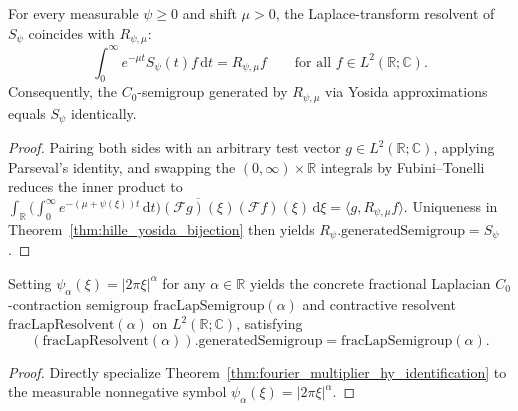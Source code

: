\begin{theorem}\label{thm:fourier_multiplier_hy_identification}
\leanok
For every measurable $\psi \ge 0$ and shift $\mu > 0$, the Laplace-transform resolvent of $S_\psi$ coincides with $R_{\psi, \mu}$:
\[
  \int_0^\infty e^{-\mu t} S_\psi(t) f \, \mathrm{d}t = R_{\psi, \mu} f \qquad \text{for all } f \in L^2(\mathbb{R}; \mathbb{C}).
\]
Consequently, the $C_0$-semigroup generated by $R_{\psi, \mu}$ via Yosida approximations equals $S_\psi$ identically.
\end{theorem}

\begin{proof}
\leanok
Pairing both sides with an arbitrary test vector $g \in L^2(\mathbb{R}; \mathbb{C})$, applying Parseval's identity, and swapping the $(0, \infty) \times \mathbb{R}$ integrals by Fubini--Tonelli reduces the inner product to $\int_{\mathbb{R}} \bigl(\int_0^\infty e^{-(\mu + \psi(\xi)) t} \, \mathrm{d}t\bigr) \overline{(\mathcal{F}g)(\xi)} (\mathcal{F}f)(\xi) \, \mathrm{d}\xi = \langle g, R_{\psi, \mu} f \rangle$. Uniqueness in Theorem~\ref{thm:hille_yosida_bijection} then yields $R_\psi.\mathrm{generatedSemigroup} = S_\psi$.
\end{proof}

\begin{theorem}\label{thm:concrete_frac_lap_semigroup}
\leanok
Setting $\psi_\alpha(\xi) = \lvert 2\pi\xi \rvert^\alpha$ for any $\alpha \in \mathbb{R}$ yields the concrete fractional Laplacian $C_0$-contraction semigroup $\mathrm{fracLapSemigroup}(\alpha)$ and contractive resolvent $\mathrm{fracLapResolvent}(\alpha)$ on $L^2(\mathbb{R}; \mathbb{C})$, satisfying
\[
  (\mathrm{fracLapResolvent}(\alpha)).\mathrm{generatedSemigroup} = \mathrm{fracLapSemigroup}(\alpha).
\]
\end{theorem}

\begin{proof}
\leanok
Directly specialize Theorem~\ref{thm:fourier_multiplier_hy_identification} to the measurable nonnegative symbol $\psi_\alpha(\xi) = \lvert 2\pi\xi \rvert^\alpha$.
\end{proof}

